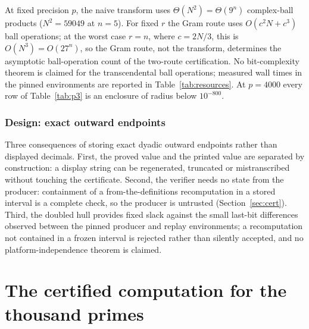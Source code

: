 \documentclass[11pt]{amsart}
\theoremstyle{remark}\newtheorem{remark}[theorem]{Remark}
\theoremstyle{definition}\newtheorem{definition}[theorem]{Definition}
\theoremstyle{definition}\newtheorem{algorithm}[theorem]{Algorithm}
\begin{document}
At fixed precision $p$, the naive transform uses $\Theta(N^2)=\Theta(9^n)$ complex-ball products ($N^2=59049$ at $n=5$). For fixed $r$ the Gram route uses $O(c^2N+c^3)$ ball operations; at the worst case $r=n$, where $c=2N/3$, this is $O(N^3)=O(27^n)$, so the Gram route, not the transform, determines the asymptotic ball-operation count of the two-route certification. No bit-complexity theorem is claimed for the transcendental ball operations; measured wall times in the pinned environments are reported in Table~\ref{tab:resources}. At $p=4000$ every row of Table~\ref{tab:p3} is an enclosure of radius below $10^{-800}$.

\subsubsection*{Design: exact outward endpoints}
Three consequences of storing exact dyadic outward endpoints rather than displayed decimals. First, the proved value and the printed value are separated by construction: a display string can be regenerated, truncated or mistranscribed without touching the certificate. Second, the verifier needs no state from the producer: containment of a from-the-definitions recomputation in a stored interval is a complete check, so the producer is untrusted (Section~\ref{sec:cert}). Third, the doubled hull provides fixed slack against the small last-bit differences observed between the pinned producer and replay environments; a recomputation not contained in a frozen interval is rejected rather than silently accepted, and no platform-independence theorem is claimed.
\section{The certified computation for the thousand primes}\label{sec:ky1000}
\end{document}
